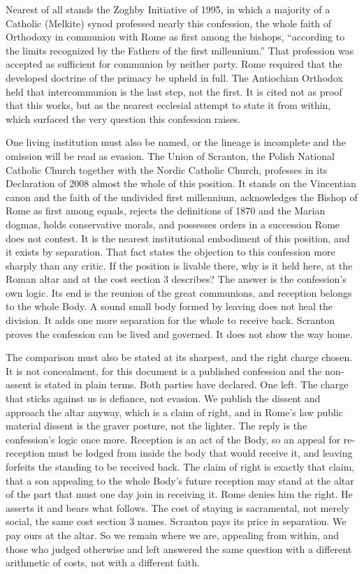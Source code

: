 \documentclass[11pt,twoside]{article}
\newcommand{\unit}[1]{\needspace{3\baselineskip}\par\medskip{\normalfont\bfseries\color{subhead}#1}\par\nobreak\smallskip}
\begin{document}
\unit{Zoghby.}
Nearest of all stands the Zoghby Initiative of 1995, in which a majority of a Catholic (Melkite) synod professed nearly this confession, the whole faith of Orthodoxy in communion with Rome as first among the bishops, ``according to the limits recognized by the Fathers of the first millennium.'' That profession was accepted as sufficient for communion by neither party. Rome required that the developed doctrine of the primacy be upheld in full. The Antiochian Orthodox held that intercommunion is the last step, not the first. It is cited not as proof that this works, but as the nearest ecclesial attempt to state it from within, which surfaced the very question this confession raises.

\unit{Scranton, and the objection.}
One living institution must also be named, or the lineage is incomplete and the omission will be read as evasion. The Union of Scranton, the Polish National Catholic Church together with the Nordic Catholic Church, professes in its Declaration of 2008 almost the whole of this position. It stands on the Vincentian canon and the faith of the undivided first millennium, acknowledges the Bishop of Rome as first among equals, rejects the definitions of 1870 and the Marian dogmas, holds conservative morals, and possesses orders in a succession Rome does not contest. It is the nearest institutional embodiment of this position, and it exists by separation. That fact states the objection to this confession more sharply than any critic. If the position is livable there, why is it held here, at the Roman altar and at the cost section 3 describes? The answer is the confession's own logic. Its end is the reunion of the great communions, and reception belongs to the whole Body. A sound small body formed by leaving does not heal the division. It adds one more separation for the whole to receive back. Scranton proves the confession can be lived and governed. It does not show the way home.

\unit{Defiance, not evasion.}
The comparison must also be stated at its sharpest, and the right charge chosen. It is not concealment, for this document is a published confession and the non-assent is stated in plain terms. Both parties have declared. One left. The charge that sticks against us is defiance, not evasion. We publish the dissent and approach the altar anyway, which is a claim of right, and in Rome's law public material dissent is the graver posture, not the lighter. The reply is the confession's logic once more. Reception is an act of the Body, so an appeal for re-reception must be lodged from inside the body that would receive it, and leaving forfeits the standing to be received back. The claim of right is exactly that claim, that a son appealing to the whole Body's future reception may stand at the altar of the part that must one day join in receiving it. Rome denies him the right. He asserts it and bears what follows. The cost of staying is sacramental, not merely social, the same cost section 3 names. Scranton pays its price in separation. We pay ours at the altar. So we remain where we are, appealing from within, and those who judged otherwise and left answered the same question with a different arithmetic of costs, not with a different faith.
\end{document}
